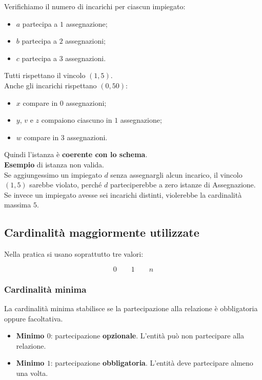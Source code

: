 Verifichiamo il numero di incarichi per ciascun impiegato:
\begin{itemize}
    \item $a$ partecipa a $1$ assegnazione;
    \item $b$ partecipa a $2$ assegnazioni;
    \item $c$ partecipa a $3$ assegnazioni.
\end{itemize}
\noindent
Tutti rispettano il vincolo $(1,5)$.\\
Anche gli incarichi rispettano $(0,50)$:
\begin{itemize}
    \item $x$ compare in $0$ assegnazioni;
    \item $y$, $v$ e $z$ compaiono ciascuno in $1$ assegnazione;
    \item $w$ compare in $3$ assegnazioni.
\end{itemize}
\noindent
Quindi l'istanza è \textbf{coerente con lo schema}.\medskip\\
\textcolor{verdeEsempio}{\textbf{Esempio}} di istanza non valida. \\
Se aggiungessimo un impiegato $d$ senza assegnargli alcun incarico,
il vincolo $(1,5)$ sarebbe violato, perché $d$ parteciperebbe
a zero istanze di Assegnazione.\\
Se invece un impiegato avesse sei incarichi distinti,
violerebbe la cardinalità massima $5$.

\subsection{Cardinalità maggiormente utilizzate}

Nella pratica si usano soprattutto tre valori:

\[
\boxed{0 \qquad 1 \qquad n}
\]

\subsubsection*{Cardinalità minima}

La cardinalità minima stabilisce se la partecipazione
alla relazione è obbligatoria oppure facoltativa.
\begin{itemize}
    \item \textbf{Minimo $0$}: partecipazione \textbf{opzionale}.
    L'entità può non partecipare alla relazione.
    \item \textbf{Minimo $1$}: partecipazione \textbf{obbligatoria}.
    L'entità deve partecipare almeno una volta.
\end{itemize}

